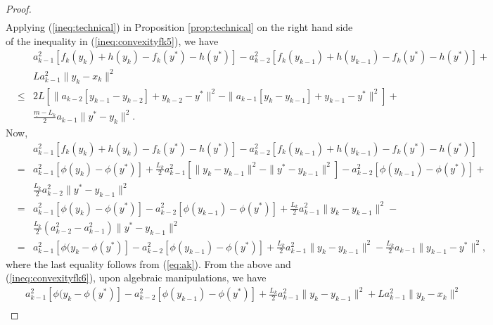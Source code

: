\documentclass[10pt,a4paper]{amsart}
\begin{document}
\begin{proof}
\begin{eqnarray}
\end{eqnarray}
Applying (\ref{ineq:technical}) in Proposition \ref{prop:technical} on the right hand side of the inequality in (\ref{ineq:convexityfk5}), we have
\begin{eqnarray}
& & a_{k-1}^2[f_{k}(y_{k}) + h(y_{k}) - f_{k}(y^\ast) - h(y^\ast)] - a_{k-2}^2[f_{k}(y_{k-1}) + h(y_{k-1}) - f_{k}(y^\ast) - h(y^\ast)] + \nonumber \\
& & La_{k-1}^2 \| y_{k} - {x}_{k} \|^2  \nonumber \\
& \leq &   2 L [\|a_{k-2}[ y_{k-1} - y_{k-2}]  + y_{k-2} - y^\ast \|^2 - \| a_{k-1}[ y_{k} - y_{k-1}]  + y_{k-1} - y^\ast \|^2] + \nonumber \\
&   & \frac{\underline{m} - L_k}{2} a_{k-1} \| y^\ast - y_{k} \|^2. \label{ineq:convexityfk6}
\end{eqnarray}
Now,
\begin{eqnarray*}
& & a_{k-1}^2[f_{k}(y_{k}) + h(y_{k}) - f_{k}(y^\ast) - h(y^\ast)] - a_{k-2}^2[f_{k}(y_{k-1}) + h(y_{k-1}) - f_{k}(y^\ast) - h(y^\ast)] \nonumber \\
& = & a_{k-1}^2[\phi(y_{k}) - \phi(y^\ast)]  + \frac{L_k}{2}a_{k-1}^2[\|y_{k} - y_{k-1} \|^2 - \| y^\ast - y_{k-1} \|^2]  - a_{k-2}^2[\phi(y_{k-1}) - \phi(y^\ast)] + \\
& & \frac{L_k}{2}a_{k-2}^2  \| y^\ast - y_{k-1} \|^2 \\
& = & a_{k-1}^2[\phi(y_{k}) - \phi(y^\ast)] - a_{k-2}^2 [\phi(y_{k-1}) - \phi(y^\ast)] + \frac{L_k}{2}a_{k-1}^2 \|y_{k} - y_{k-1} \|^2 - \\
&  & \frac{L_k}{2}( a_{k-2}^2 - a_{k-1}^2) \| y^\ast - y_{k-1} \|^2 \\
& = & a_{k-1}^2[\phi(y_{k} - \phi(y^\ast)] - a_{k-2}^2 [\phi(y_{k-1}) - \phi(y^\ast)] + \frac{L_k}{2}a_{k-1}^2  \|y_{k} - y_{k-1} \|^2 -  \frac{L_k}{2} a_{k-1} \| y_{k-1} - y^\ast \|^2,
\end{eqnarray*}
where the last equality follows from (\ref{eq:ak}).   From the above and (\ref{ineq:convexityfk6}), upon algebraic manipulations, we have
\begin{eqnarray*}
& & a_{k-1}^2[\phi(y_{k} - \phi(y^\ast)] - a_{k-2}^2 [\phi(y_{k-1}) - \phi(y^\ast)] + \frac{L_k}{2} a_{k-1}^2 \|y_{k} - y_{k-1} \|^2 +  La_{k-1}^2 \| y_{k} - {x}_{k} \|^2 \\

\end{eqnarray*}
\end{proof}
\end{document}
